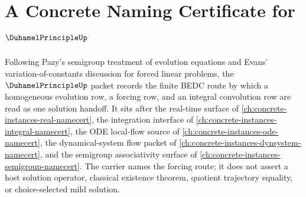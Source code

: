 \chapter{A Concrete Naming Certificate for $\DuhamelPrincipleUp$}
\label{ch:concrete-instances-duhamel-principle-namecert}

Following Pazy's semigroup treatment of evolution equations and Evans' variation-of-constants discussion for forced linear problems, the $\DuhamelPrincipleUp$ packet records the finite BEDC route by which a homogeneous evolution row, a forcing row, and an integral convolution row are read as one solution handoff. It sits after the real-time surface of \autoref{ch:concrete-instances-real-namecert}, the integration interface of \autoref{ch:concrete-instances-integral-namecert}, the ODE local-flow source of \autoref{ch:concrete-instances-ode-namecert}, the dynamical-system flow packet of \autoref{ch:concrete-instances-dynsystem-namecert}, and the semigroup associativity surface of \autoref{ch:concrete-instances-semigroup-namecert}. The carrier names the forcing route; it does not assert a host solution operator, classical existence theorem, quotient trajectory equality, or choice-selected mild solution.

